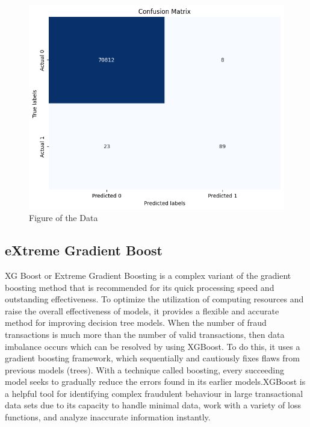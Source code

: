  \begin{figure}[ht]
    \centering
    \includegraphics[scale=0.7]{figures/CM_RandomForest.png}
    \caption{Figure of the Data}
    \label{fig:Plot of the Data}
\end{figure}



 \subsection{eXtreme Gradient Boost }

 XG Boost or Extreme Gradient Boosting is a complex variant of the gradient boosting method that is recommended for its quick processing speed and outstanding effectiveness. To optimize the utilization of computing resources and raise the overall effectiveness of models, it provides a flexible and accurate method for improving decision tree models. When the number of fraud transactions is much more than the number of valid transactions, then data imbalance occurs which can be resolved by using XGBoost. To do this, it uses a gradient boosting framework, which sequentially and cautiously fixes flaws from previous models (trees). With a technique called boosting, every succeeding model seeks to gradually reduce the errors found in its earlier models.XGBoost is a helpful tool for identifying complex fraudulent behaviour in large transactional data sets due to its capacity to handle minimal data, work with a variety of loss functions, and analyze inaccurate information instantly. 
\clearpage


